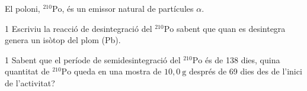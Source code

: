 El poloni, $^{210}\mathrm{Po}$, és un emissor natural de partícules $\alpha$.

\begin{apartat}{1}
Escriviu la reacció de desintegració del $^{210}\mathrm{Po}$ sabent que quan es desintegra genera un isòtop del plom (Pb).
\end{apartat}

\begin{apartat}{1}
Sabent que el període de semidesintegració del $^{210}\mathrm{Po}$ és de 138 dies, quina quantitat de $^{210}\mathrm{Po}$ queda en una mostra de $10,0\ \mathrm{g}$ després de 69 dies des de l'inici de l'activitat?
\end{apartat}

